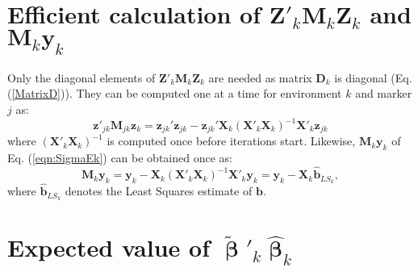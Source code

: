 \documentclass{bmcart}
\begin{document}
\begin{backmatter}



\newpage

\end{backmatter}

\appendix

\section{Efficient calculation of $\mathbf{Z}'_{k} \mathbf{M}_{k} \mathbf{Z}_{k}$ and  $\mathbf{M}_{k}\mathbf{y}_k$\label{byPassM}}

Only the diagonal elements of  $\mathbf{Z}'_{k} \mathbf{M}_{k} \mathbf{Z}_{k}$ are needed as matrix $\mathbf{D}_k$ is diagonal (Eq. (\ref{MatrixD})). They can be computed one at a time for environment $k$ and marker $j$ as:
\begin{equation}\nonumber
\label{eqn:TrZMZ}
\mathbf{z}'_{jk} \mathbf{M}_{jk} \mathbf{z}_{k}  = \mathbf{z}_{jk}'\mathbf{z}_{jk} - \mathbf{z}_{jk}'\mathbf{X}_{k}(\mathbf{X}'_{k} \mathbf{X}_{k})^{-1} \mathbf{X}'_{k} \mathbf{z}_{jk}
\end{equation}
where $(\mathbf{X}'_{k} \mathbf{X}_{k})^{-1}$ is computed once before iterations start. Likewise, $\mathbf{M}_{k}\mathbf{y}_k$ of Eq. (\ref{eqn:SigmaEk}) can be obtained once as:
\begin{equation}\nonumber
\label{eqn:My}
\mathbf{M}_{k}\mathbf{y}_k = \mathbf{y}_k - \mathbf{X}_{k}(\mathbf{X}'_{k} \mathbf{X}_{k})^{-1} \mathbf{X}'_{k} \mathbf{y}_k = \mathbf{y}_k - \mathbf{X}_{k} \mathbf{\hat{b}}_{LS_k},
\end{equation}
where $\mathbf{\hat{b}}_{LS_k}$ denotes the Least Squares estimate of $\mathbf{b}$.


\section{Expected value of $\tilde{\mathbf{\upbeta}}'_k\hat{\mathbf{\upbeta}}_k$\label{EVTH}}
\end{document}

